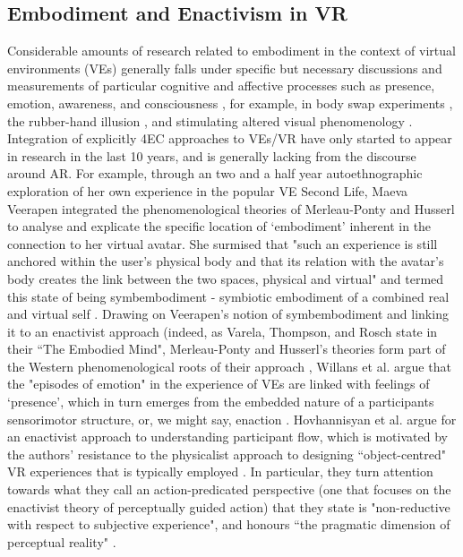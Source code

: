\subsection{Embodiment and Enactivism in VR}\label{sec: theory-embodimentvr}
Considerable amounts of research related to embodiment in the context of virtual environments (VEs) generally falls under specific but necessary discussions and measurements of particular cognitive and affective processes such as presence, emotion, awareness, and consciousness \citep[]{slater1994,seth2012}, for example, in body swap experiments \citep[]{slater2010}, the rubber-hand illusion \citep[]{suzuki2013}, and stimulating altered visual phenomenology \citep[]{suzuki2017}. Integration of explicitly 4EC approaches to VEs/VR have only started to appear in research in the last 10 years, and is generally lacking from the discourse around AR. For example, through an two and a half year autoethnographic exploration of her own experience in the popular VE Second Life, Maeva Veerapen integrated the phenomenological theories of Merleau-Ponty and Husserl to analyse and explicate the specific location of `embodiment' inherent in the connection to her virtual avatar. She surmised that "such an experience is still anchored within the user's physical body and that its relation with the avatar's body creates the link between the two spaces, physical and virtual" and termed this state of being symbembodiment - symbiotic embodiment of a combined real and virtual self \citep[]{veerapen2011}. Drawing on Veerapen's notion of symbembodiment and linking it to an enactivist approach (indeed, as Varela, Thompson, and Rosch state in their ``The Embodied Mind", Merleau-Ponty and Husserl's theories form part of the Western phenomenological roots of their approach \citeyearpar[pp. 173, 18]{varela1993}, Willans et al. argue that the "episodes of emotion" in the experience of VEs are linked with feelings of `presence', which in turn emerges from the embedded nature of a participants sensorimotor structure, or, we might say, enaction \citeyearpar[p. 23]{willans2016}. Hovhannisyan et al. argue for an enactivist approach to understanding participant flow, which is motivated by the authors' resistance to the physicalist approach to designing ``object-centred"  VR experiences that is typically employed \citeyearpar[p. 1]{hovhannisyan2019}. In particular, they turn attention towards what they call an action-predicated perspective (one that focuses on the enactivist theory of perceptually guided action) that they state is "non-reductive with respect to subjective experience", and honours ``the pragmatic dimension of perceptual reality" \citeyearpar[p. 18]{hovhannisyan2019}. 

